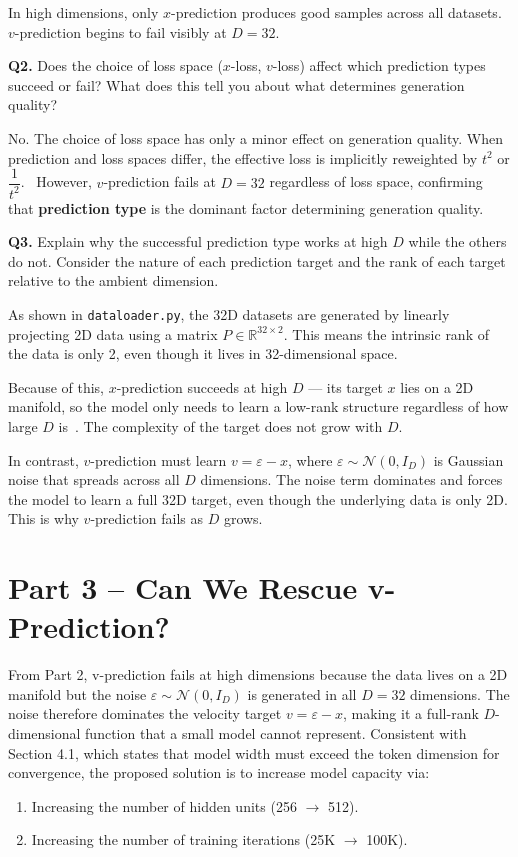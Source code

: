 \documentclass[11pt, a4paper]{article}
\begin{document}
In high dimensions, only $x$-prediction produces good samples across all datasets.
$v$-prediction begins to fail visibly at $D=32$.

\textbf{Q2.}
Does the choice of loss space ($x$-loss, $v$-loss) affect which prediction
types succeed or fail? What does this tell you about what determines generation
quality?

No. The choice of loss space has only a minor effect on generation quality. When prediction 
and loss spaces differ, the effective loss is implicitly reweighted by $t^2$ or $\dfrac{1}{t^2}$. 
However, $v$-prediction fails at $D=32$ regardless of loss space, confirming
that \textbf{prediction type} is the dominant factor determining generation quality.

\textbf{Q3.}
Explain why the successful prediction type works at high $D$ while the others
do not. Consider the nature of each prediction target and the rank of each
target relative to the ambient dimension.

As shown in \texttt{dataloader.py}, the 32D datasets are generated by linearly projecting 2D data using a matrix $P \in \mathbb{R}^{32 \times 2}$. This means the intrinsic rank of the data is only 2, even though it lives in 32-dimensional space.

Because of this, $x$-prediction succeeds at high $D$ — its target $x$ lies on a 2D manifold, so the model only needs to learn a low-rank structure regardless of how large $D$ is~\cite{li2025denoise}. The complexity of the target does not grow with $D$.

In contrast, $v$-prediction must learn $v = \varepsilon - x$, where $\varepsilon \sim \mathcal{N}(0, I_D)$ is Gaussian noise that spreads across all $D$ dimensions. The noise term dominates and forces the model to learn a full 32D target, even though the underlying data is only 2D. This is why $v$-prediction fails as $D$ grows.

\section{Part 3 – Can We Rescue v-Prediction?}

From Part 2, v-prediction fails at high dimensions because the data lives on a 2D manifold
but the noise $\varepsilon \sim \mathcal{N}(0, I_D)$ is generated in all $D=32$ dimensions.
The noise therefore dominates the velocity target $v = \varepsilon - x$, making it a full-rank
$D$-dimensional function that a small model cannot represent.
Consistent with~\cite{zheng2025rae} Section 4.1, which states that model width must exceed the token dimension
for convergence, the proposed solution is to increase model capacity via:
\begin{enumerate}
  \item Increasing the number of hidden units (256 $\to$ 512).
  \item Increasing the number of training iterations (25K $\to$ 100K).
\end{enumerate}
\end{document}
